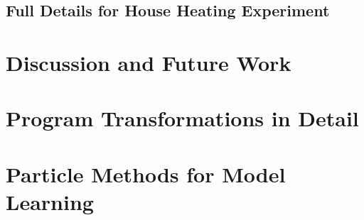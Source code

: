 


\subsection{Full Details for House Heating Experiment}
\label{sec:app:heating}



\section{Discussion and Future Work}
\label{sec:disc}



\section{Program Transformations in Detail}
\label{sec:program-transformations}


\section{Particle Methods for Model Learning}
\label{sec:part:learning}

